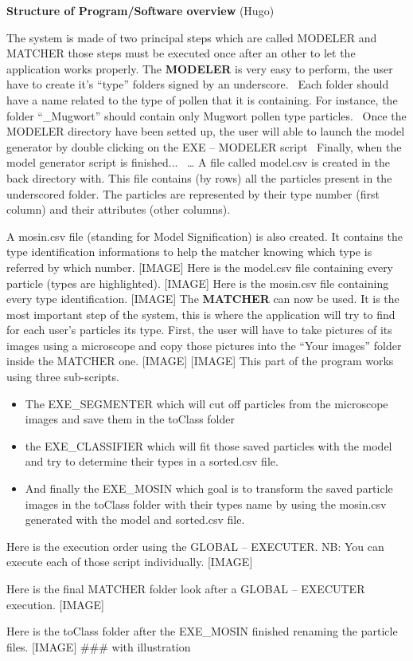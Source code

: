 \textbf{Structure of Program/Software overview} (Hugo) 

The system is made of two principal steps which are called MODELER and MATCHER those steps must be executed once after an other to let the application works properly.
The \textbf{MODELER} is very easy to perform, the user have to create it's “type” folders signed by an underscore.
\
Each folder should have a name related to the type of pollen that it is containing. For instance, the folder “\_Mugwort” should contain only Mugwort pollen type particles.
\
Once the MODELER directory have been setted up, the user will able to launch the model generator by double clicking on the EXE – MODELER script
\
Finally, when the model generator script is finished...
\
… A file called model.csv is created in the back directory with. This file contains (by rows) all the particles present in the underscored folder. The particles are represented by their type number (first column) and their attributes (other columns).

A mosin.csv file (standing for Model Signification) is also created. It contains the type identification informations to help the matcher knowing which type is referred by which number.
[IMAGE]
Here is the model.csv file containing every particle (types are highlighted).
[IMAGE]
Here is the mosin.csv file containing every type identification.
[IMAGE]
The \textbf{MATCHER} can now be used. It is the most important step of the system, this is where the application will try to find for each user's particles its type.
First, the user will have to take pictures of its images using a microscope and copy those pictures into the “Your images” folder inside the MATCHER one.
[IMAGE]
[IMAGE]
This part of the program works using three sub-scripts.

\begin{itemize}
\item The EXE\_SEGMENTER which will cut off particles from the microscope images and save them in the toClass folder

\item the EXE\_CLASSIFIER which will fit those saved particles with the model and try to determine their types in a sorted.csv file.

\item And finally the EXE\_MOSIN which goal is to transform the saved particle images in the toClass folder with their types name by using the mosin.csv generated with the model and sorted.csv file.
\end{itemize}

Here is the execution order using the GLOBAL – EXECUTER.
NB: You can execute each of those script individually.
[IMAGE]

Here is the final MATCHER folder look after a GLOBAL – EXECUTER execution.
[IMAGE]

Here is the toClass folder after the EXE_MOSIN finished renaming the particle files.
[IMAGE]
### with illustration
    
    
    
    
    
    
    
    
    
    
    
    